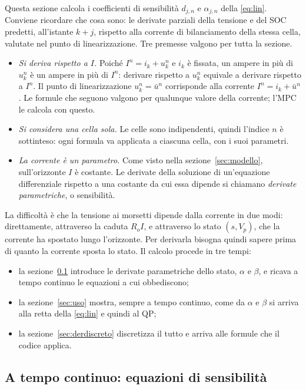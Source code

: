 \documentclass[11pt,a4paper]{article}
\begin{document}
Questa sezione calcola i coefficienti di sensibilità $d_{j,n}$ e $\alpha_{j,n}$
della \eqref{eq:lin}. Conviene ricordare che cosa sono: le derivate parziali
della tensione e del SOC predetti, all'istante $k+j$, rispetto alla corrente
di bilanciamento della stessa cella, valutate nel punto di linearizzazione.
Tre premesse valgono per tutta la sezione.
\begin{itemize}
  \item \emph{Si deriva rispetto a $I$.} Poiché $I^n = i_k + u^n_k$ e $i_k$ è
        fissata, un ampere in più di $u^n_k$ è un ampere in più di $I^n$:
        derivare rispetto a $u^n_k$ equivale a derivare rispetto a $I^n$. Il
        punto di linearizzazione $u^n_k = \bar u^n$ corrisponde alla corrente
        $I^n = i_k + \bar u^n$. Le formule che seguono valgono per qualunque
        valore della corrente; l'MPC le calcola con questo.
  \item \emph{Si considera una cella sola.} Le celle sono indipendenti, quindi
        l'indice $n$ è sottinteso: ogni formula va applicata a ciascuna cella,
        con i suoi parametri.
  \item \emph{La corrente è un parametro.} Come visto nella
        sezione~\ref{sec:modello}, sull'orizzonte $I$ è costante. Le derivate
        della soluzione di un'equazione differenziale rispetto a una costante
        da cui essa dipende si chiamano \emph{derivate parametriche}, o
        sensibilità.
\end{itemize}
La difficoltà è che la tensione ai morsetti dipende dalla corrente in due modi:
direttamente, attraverso la caduta $R_o I$, e attraverso lo stato $(s, V_p)$,
che la corrente ha spostato lungo l'orizzonte. Per derivarla bisogna quindi
sapere prima di quanto la corrente sposta lo stato. Il calcolo procede in tre
tempi:
\begin{itemize}
  \item la sezione~\ref{sec:sens} introduce le derivate parametriche dello
        stato, $\alpha$ e $\beta$, e ricava a tempo continuo le equazioni a cui
        obbediscono;
  \item la sezione~\ref{sec:uso} mostra, sempre a tempo continuo, come da
        $\alpha$ e $\beta$ si arriva alla retta della \eqref{eq:lin} e quindi
        al QP;
  \item la sezione~\ref{sec:derdiscreto} discretizza il tutto e arriva alle
        formule che il codice applica.
\end{itemize}

\subsection{A tempo continuo: equazioni di sensibilità}\label{sec:sens}
\end{document}
